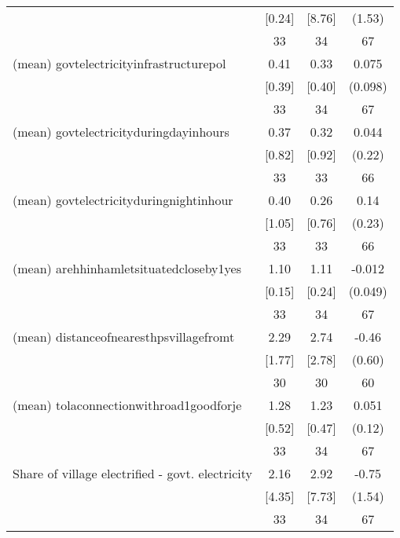 \begin{table}[htbp]
\begin{tabular*}{0.9\hsize}{@{\hskip\tabcolsep\extracolsep\fill}l*{1}{ccc}}
                                &   [0.24]&   [8.76]&   (1.53)         \\
                                &       33&       34&       67         \\
(mean) govtelectricityinfrastructurepol&     0.41&     0.33&    0.075         \\
                                &   [0.39]&   [0.40]&  (0.098)         \\
                                &       33&       34&       67         \\
(mean) govtelectricityduringdayinhours&     0.37&     0.32&    0.044         \\
                                &   [0.82]&   [0.92]&   (0.22)         \\
                                &       33&       33&       66         \\
(mean) govtelectricityduringnightinhour&     0.40&     0.26&     0.14         \\
                                &   [1.05]&   [0.76]&   (0.23)         \\
                                &       33&       33&       66         \\
(mean) arehhinhamletsituatedcloseby1yes&     1.10&     1.11&   -0.012         \\
                                &   [0.15]&   [0.24]&  (0.049)         \\
                                &       33&       34&       67         \\
(mean) distanceofnearesthpsvillagefromt&     2.29&     2.74&    -0.46         \\
                                &   [1.77]&   [2.78]&   (0.60)         \\
                                &       30&       30&       60         \\
(mean) tolaconnectionwithroad1goodforje&     1.28&     1.23&    0.051         \\
                                &   [0.52]&   [0.47]&   (0.12)         \\
                                &       33&       34&       67         \\
Share of village electrified - govt. electricity&     2.16&     2.92&    -0.75         \\
                                &   [4.35]&   [7.73]&   (1.54)         \\
                                &       33&       34&       67         \\

\end{tabular*}
\end{table}

